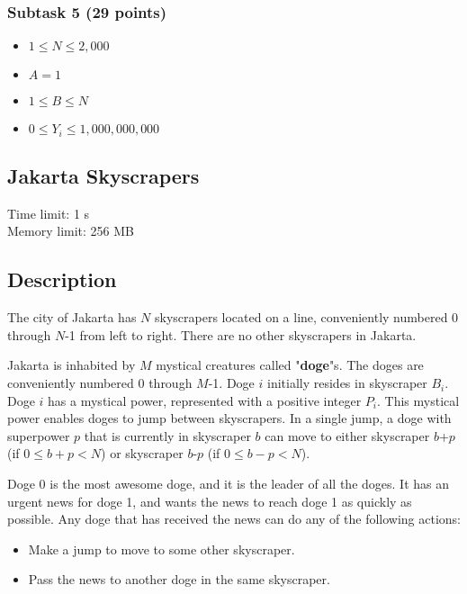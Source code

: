 \documentclass{report}
\begin{document}
\subsubsection{Subtask 5 (29 points)}
\begin{itemize} \itemsep1pt \parskip0pt
\item $1 \le N \le 2,000$
\item $A = 1$
\item $1 \le B \le N$
\item $0 \le Y_i \le 1,000,000,000$
\end{itemize}

\newpage
\begin{center}
\section*{Jakarta Skyscrapers}
Time limit: 1 s\\
Memory limit: 256 MB
\end{center}

\subsection*{Description}

The city of Jakarta has $N$ skyscrapers located on a line, conveniently numbered 0 through $N$-1 from left to right. There are no other skyscrapers in Jakarta.

Jakarta is inhabited by $M$ mystical creatures called "\textbf{doge}"s. The doges are conveniently numbered 0 through $M$-1. Doge $i$ initially resides in skyscraper $B_i$. Doge $i$ has a mystical power, represented with a positive integer $P_i$. This mystical power enables doges to jump between skyscrapers. In a single jump, a doge with superpower $p$ that is currently in skyscraper $b$ can move to either skyscraper $b$+$p$ (if $0 \le b+p < N$) or skyscraper $b$-$p$ (if $0 \le b-p < N$).

Doge 0 is the most awesome doge, and it is the leader of all the doges. It has an urgent news for doge 1, and wants the news to reach doge 1 as quickly as possible. Any doge that has received the news can do any of the following actions:

\begin{itemize} \parskip0pt \itemsep1pt
\item Make a jump to move to some other skyscraper.
\item Pass the news to another doge in the same skyscraper.
\end{itemize}
\end{document}
